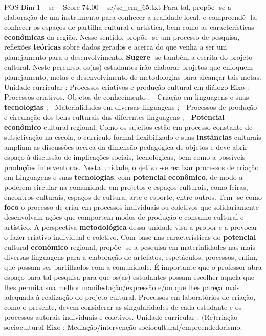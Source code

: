 \begin{textsample}{POS Dim 1 – sc – Score 74.00 – sc/sc\_em\_65.txt}
Para tal, propõe -se a elaboração de um instrumento para conhecer a realidade local, e compreendê -la, conhecer os espaços de partilha cultural e artística, bem como as características \textbf{econômicas} da região.
Nesse sentido, propõe -se um processo de pesquisa, reflexões \textbf{teóricas} sobre dados gerados e acerca do que venha a ser um planejamento para o desenvolvimento. \textbf{Sugere} -se também a escrita do projeto cultural.
Neste percurso, os(as) estudantes irão elaborar projetos que enfoquem planejamento, metas e desenvolvimento de metodologias para alcançar tais metas.
Unidade curricular : Processos criativos e produção cultural em diálogo Eixo : Processos criativos.
Objetos de conhecimento : - Criação em linguagens e suas \textbf{tecnologias} ; - Materialidades em diversas linguagens ; - Processos de produção e circulação dos bens culturais das diferentes linguagens ; - \textbf{Potencial} \textbf{econômico} cultural regional.
Como os sujeitos estão em processo constante de subjetivação na escola, o currículo formal flexibilizado e suas \textbf{instâncias} culturais ampliam as discussões acerca da dimensão pedagógica de objetos e deve abrir espaço à discussão de implicações sociais, tecnológicas, bem como a possíveis produções interventoras.
Nesta unidade, objetiva -se realizar processos de criação em Linguagens e suas \textbf{tecnologias}, com \textbf{potencial} \textbf{econômico}, de modo a poderem circular na comunidade em projetos e espaços culturais, como feiras, encontros culturais, espaços de cultura, arte e esporte, entre outros.
Tem -se como \textbf{foco} o processo de criar em processos individuais ou coletivos que solidariamente desenvolvam ações que comportem modos de produção e consumo cultural e artístico.
A perspectiva \textbf{metodológica} dessa unidade visa a propor e a provocar o fazer criativo individual e coletivo.
Com base nas características do \textbf{potencial} cultural \textbf{econômico} regional, propõe -se a pesquisa em materialidades nas mais diversas linguagens para a elaboração de artefatos, espetáculos, processos, enfim, que possam ser partilhados com a comunidade.
É importante que o professor abra espaço para tal pesquisa para que os(as) estudantes possam escolher aquela que lhes permita sua melhor manifestação/expressão e/ou que lhes pareça mais adequada à realização do projeto cultural.
Processos em laboratórios de criação, como o presente, devem considerar as singularidades de cada estudante e os processos autorais individuais e coletivos.
Unidade curricular : (Re)criação sociocultural Eixo : Mediação/intervenção sociocultural/empreendedorismo.

\end{textsample}
